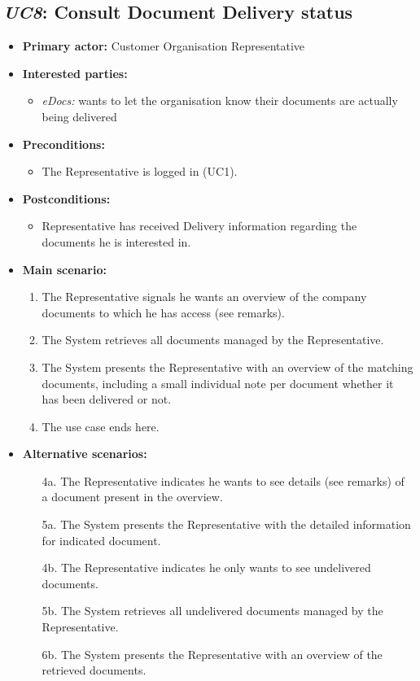 \documentclass[a4paper,10pt]{article}
\begin{document}
\subsection{\emph{UC8}: Consult Document Delivery status}
\begin{itemize}
    \item \textbf{Primary actor:} Customer Organisation Representative
    \item \textbf{Interested parties:} 
        \begin{itemize}
            \item \textit{eDocs:} wants to let the organisation know their documents are actually being delivered
        \end{itemize}

    \item \textbf{Preconditions:}
        \begin{itemize}
            \item The Representative is logged in (UC1).
        \end{itemize}

    \item \textbf{Postconditions:}
        \begin{itemize}
            \item Representative has received Delivery information regarding the documents he is interested in.
        \end{itemize}
        
    \item \textbf{Main scenario:} 
    \begin{enumerate}
       \item The Representative signals he wants an overview of the company documents to which he has access (see remarks).
       \item The System retrieves all documents managed by the Representative.
       \item The System presents the Representative with an overview of the matching documents, including a small individual note per document whether it has been delivered or not.
       \item The use case ends here.
    \end{enumerate}

    \item \textbf{Alternative scenarios:} 
    \begin{enumerate}
        \item [4a.] The Representative indicates he wants to see details (see remarks) of a document present in the overview.
        \item [5a.] The System presents the Representative with the detailed information for indicated document.
        \item [4b.] The Representative indicates he only wants to see undelivered documents.
        \item [5b.] The System retrieves all undelivered documents managed by the Representative.
        \item [6b.] The System presents the Representative with an overview of the retrieved documents.
    \end{enumerate}
    

\end{itemize}
\end{document}

